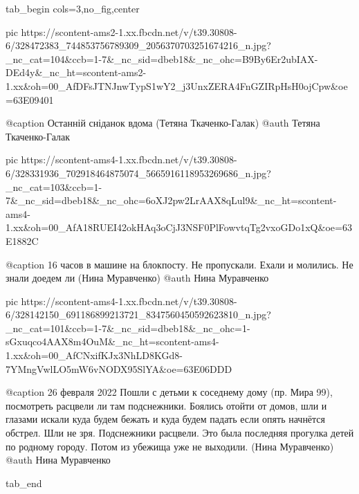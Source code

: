  
 
 
 
 


\ifcmt
  tab_begin cols=3,no_fig,center

     pic https://scontent-ams2-1.xx.fbcdn.net/v/t39.30808-6/328472383_744853756789309_2056370703251674216_n.jpg?_nc_cat=104&ccb=1-7&_nc_sid=dbeb18&_nc_ohc=B9By6Er2ubIAX-DEd4y&_nc_ht=scontent-ams2-1.xx&oh=00_AfDFsJTNJnwTypS1wY2_j3UnxZERA4FnGZIRpHsH0ojCpw&oe=63E09401

     @caption Останній сніданок вдома (Тетяна Ткаченко-Галак)
     @auth Тетяна Ткаченко-Галак

     pic https://scontent-ams4-1.xx.fbcdn.net/v/t39.30808-6/328331936_702918464875074_5665916118953269686_n.jpg?_nc_cat=103&ccb=1-7&_nc_sid=dbeb18&_nc_ohc=6oXJ2pw2LrAAX8qLul9&_nc_ht=scontent-ams4-1.xx&oh=00_AfA18RUEI42okHAq3oCjJ3NSF0PlFowvtqTg2vxoGDo1xQ&oe=63E1882C

     @caption 16 часов в машине на блокпосту. Не пропускали. Ехали и молились. Не знали доедем ли (Нина Муравченко)
     @auth Нина Муравченко

     pic https://scontent-ams4-1.xx.fbcdn.net/v/t39.30808-6/328142150_691186899213721_8347560450592623810_n.jpg?_nc_cat=101&ccb=1-7&_nc_sid=dbeb18&_nc_ohc=1-sGxuqco4AAX8m4OuM&_nc_ht=scontent-ams4-1.xx&oh=00_AfCNxifKJx3NhLD8KGd8-7YMngVwlLO5mW6vNODX95SlYA&oe=63E06DDD

     @caption 26 февраля 2022 Пошли с детьми к соседнему дому (пр. Мира 99), посмотреть расцвели ли там подснежники. Боялись отойти от домов, шли и глазами искали куда будем бежать и куда будем падать если опять начнётся обстрел. Шли не зря. Подснежники расцвели. Это была последняя прогулка детей по родному городу. Потом из убежища уже не выходили. (Нина Муравченко)
     @auth Нина Муравченко

  tab_end
\fi
